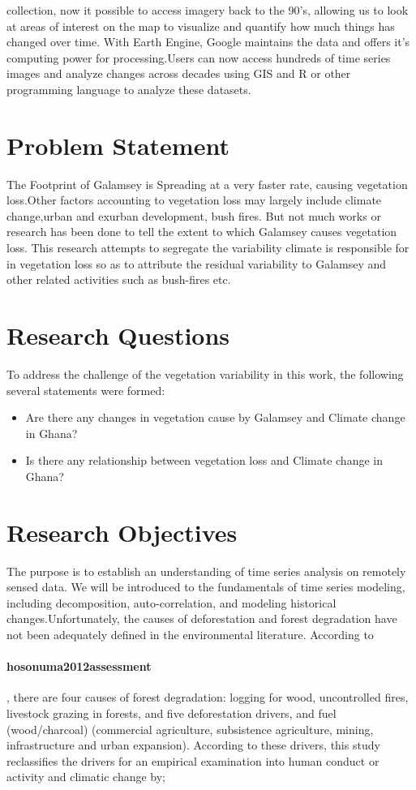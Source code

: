 collection, now it possible to access imagery back to the 90's, allowing us to look at areas of interest on the map to visualize and quantify how much things has changed over time. With Earth Engine, Google maintains the data and offers it's computing power for processing.Users can now access hundreds of time series images and analyze changes across decades using GIS and R or other programming language to analyze these datasets.

\section{Problem Statement}
The Footprint of Galamsey is Spreading at a very faster rate, causing vegetation loss.Other factors accounting to vegetation loss may largely include climate change,urban and exurban development, bush fires. But not much works or research has been done to tell the extent to which Galamsey causes vegetation loss. This research attempts to segregate the variability climate is responsible for in vegetation loss so as to attribute the residual variability to Galamsey and other related activities such as bush-fires etc.

\section{Research Questions}
To address the challenge of the vegetation variability in this work, the following several statements were formed:

\begin{itemize}
	\item  Are there any changes in vegetation cause by Galamsey and Climate change in Ghana?
	\item Is there any relationship between vegetation loss and Climate change in Ghana?
\end{itemize}

\section{Research Objectives}
The purpose is to establish an understanding of time series analysis on remotely sensed data. We will be introduced to the fundamentals of time series modeling, including decomposition, auto-correlation, and modeling historical changes.Unfortunately, the causes of deforestation and forest degradation have not been adequately defined in the environmental literature. According to \paragraph{hosonuma2012assessment}, there are four causes of forest degradation: logging for wood, uncontrolled fires, livestock grazing in forests, and
five deforestation drivers, and fuel (wood/charcoal) (commercial agriculture, subsistence agriculture, mining, infrastructure and urban expansion). According to these drivers, this study reclassifies the drivers for an empirical examination into human conduct or activity and climatic change by;

